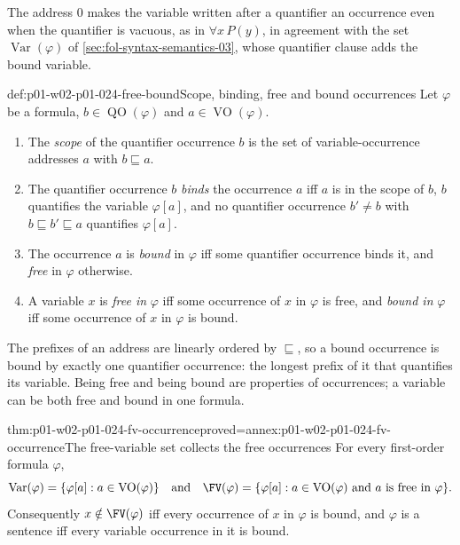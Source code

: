 The address \(0\) makes the variable written after a quantifier an
occurrence even when the quantifier is vacuous, as in \(\forall x\,P(y)\),
in agreement with the set \(\operatorname{Var}(\varphi)\) of
\cref{sec:fol-syntax-semantics-03}, whose quantifier clause adds the bound
variable.

\begin{hbdefinition}{def:p01-w02-p01-024-free-bound}{Scope, binding, free and bound occurrences}
Let \(\varphi\) be a formula, \(b\in\operatorname{QO}(\varphi)\) and
\(a\in\operatorname{VO}(\varphi)\).
\begin{enumerate}
\item The \emph{scope} of the quantifier occurrence \(b\) is the set of
  variable-occurrence addresses \(a\) with \(b\sqsubseteq a\).
\item The quantifier occurrence \(b\) \emph{binds} the occurrence \(a\) iff
  \(a\) is in the scope of \(b\), \(b\) quantifies the variable
  \(\varphi[a]\), and no quantifier occurrence \(b'\neq b\) with
  \(b\sqsubseteq b'\sqsubseteq a\) quantifies \(\varphi[a]\).
\item The occurrence \(a\) is \emph{bound} in \(\varphi\) iff some
  quantifier occurrence binds it, and \emph{free} in \(\varphi\)
  otherwise.
\item A variable \(x\) is \emph{free in} \(\varphi\) iff some occurrence of
  \(x\) in \(\varphi\) is free, and \emph{bound in} \(\varphi\) iff some
  occurrence of \(x\) in \(\varphi\) is bound.
\end{enumerate}
The prefixes of an address are linearly ordered by \(\sqsubseteq\), so a
bound occurrence is bound by exactly one quantifier occurrence: the longest
prefix of it that quantifies its variable.  Being free and being bound are
properties of occurrences; a variable can be both free and bound in one
formula.
\end{hbdefinition}

\begin{hbtheorem}{thm:p01-w02-p01-024-fv-occurrence}{proved=annex:p01-w02-p01-024-fv-occurrence}{The free-variable set collects the free occurrences}
For every first-order formula \(\varphi\),
\[
  \operatorname{Var}(\varphi)=\{\varphi[a]:a\in\operatorname{VO}(\varphi)\}
  \quad\text{and}\quad
  \FV(\varphi)=\{\varphi[a]:a\in\operatorname{VO}(\varphi)\text{ and }a
  \text{ is free in }\varphi\}.
\]
Consequently \(x\notin\FV(\varphi)\) iff every occurrence of \(x\) in
\(\varphi\) is bound, and \(\varphi\) is a sentence iff every variable
occurrence in it is bound.
\end{hbtheorem}

